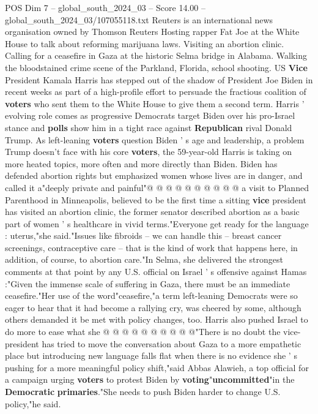 \begin{textsample}{POS Dim 7 – global\_south\_2024\_03 – Score 14.00 – global\_south\_2024\_03/107055118.txt}  \label{ex:f7_pos_157}
Reuters is an international news organisation owned by Thomson Reuters Hosting rapper Fat Joe at the White House to talk about reforming marijuana laws.
Visiting an abortion clinic.
Calling for a ceasefire in Gaza at the historic Selma bridge in Alabama.
Walking the bloodstained crime scene of the Parkland, Florida, school shooting.
US \textbf{Vice} President Kamala Harris has stepped out of the shadow of President Joe Biden in recent weeks as part of a high-profile effort to persuade the fractious coalition of \textbf{voters} who sent them to the White House to give them a second term.
Harris ' evolving role comes as progressive Democrats target Biden over his pro-Israel stance and \textbf{polls} show him in a tight race against \textbf{Republican} rival Donald Trump.
As left-leaning \textbf{voters} question Biden ' s age and leadership, a problem Trump doesn't face with his core \textbf{voters}, the 59-year-old Harris is taking on more heated topics, more often and more directly than Biden.
Biden has defended abortion rights but emphasized women whose lives are in danger, and called it a"deeply private and painful"@ @ @ @ @ @ @ @ @ @ a visit to Planned Parenthood in Minneapolis, believed to be the first time a sitting \textbf{vice} president has visited an abortion clinic, the former senator described abortion as a basic part of women ' s healthcare in vivid terms."Everyone get ready for the language : uterus,"she said."Issues like fibroids -- we can handle this -- breast cancer screenings, contraceptive care -- that is the kind of work that happens here, in addition, of course, to abortion care."In Selma, she delivered the strongest comments at that point by any U.S. official on Israel ' s offensive against Hamas :"Given the immense scale of suffering in Gaza, there must be an immediate ceasefire."Her use of the word"ceasefire,"a term left-leaning Democrats were so eager to hear that it had become a rallying cry, was cheered by some, although others demanded it be met with policy changes, too.
Harris also pushed Israel to do more to ease what she @ @ @ @ @ @ @ @ @ @"There is no doubt the vice-president has tried to move the conversation about Gaza to a more empathetic place but introducing new language falls flat when there is no evidence she ' s pushing for a more meaningful policy shift,"said Abbas Alawieh, a top official for a campaign urging \textbf{voters} to protest Biden by \textbf{voting}"\textbf{uncommitted}"in the \textbf{Democratic} \textbf{primaries}."She needs to push Biden harder to change U.S. policy,"he said.

\end{textsample}
